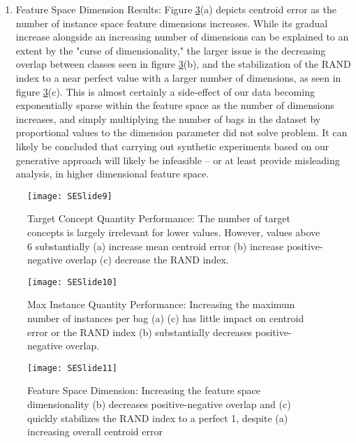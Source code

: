 \documentclass[12pt,dvips]{report}
\numberwithin{equation}{section}
\begin{document}
\begin{enumerate}
\begin{enumerate}
	\item Feature Space Dimension Results: Figure \ref{fig:SESlide11}(a) depicts centroid error as the number of instance space feature dimensions increases.  While its gradual increase alongside an increasing number of dimensions can be explained to an extent by the "curse of dimensionality," the larger issue is the decreasing overlap between classes seen in figure \ref{fig:SESlide11}(b), and the stabilization of the RAND index to a near perfect value with a larger number of dimensions, as seen in figure  \ref{fig:SESlide11}(c).  This is almost certainly a side-effect of our data becoming exponentially sparse within the feature space as the number of dimensions increases, and simply multiplying the number of bags in the dataset by proportional values to the dimension parameter did not solve problem.  It can likely be concluded that carrying out synthetic experiments based on our generative approach will likely be infeasible -- or at least provide misleading analysis, in higher dimensional feature space.

	\end{enumerate}

\begin{figure}[htb]
 \texttt{[image: SESlide9]} 
\caption{Target Concept Quantity Performance: The number of target concepts is largely irrelevant for lower values.  However, values above 6 substantially (a) increase mean centroid error (b) increase positive-negative overlap (c) decrease the RAND index.}\label{fig:SESlide9}
\end{figure}

\begin{figure}[htb]
 \texttt{[image: SESlide10]} 
\caption{Max Instance Quantity Performance: Increasing the maximum number of instances per bag (a) (c) has little impact on centroid error or the RAND index (b) substantially decreases positive-negative overlap. }\label{fig:SESlide10}
\end{figure}

\begin{figure}[htb]
 \texttt{[image: SESlide11]} 
\caption{Feature Space Dimension: Increasing the feature space dimensionality (b) decreases positive-negative overlap and (c) quickly stabilizes the RAND index to a perfect 1, despite (a) increasing overall centroid error}\label{fig:SESlide11}
\end{figure}

\end{enumerate}
\end{document}
